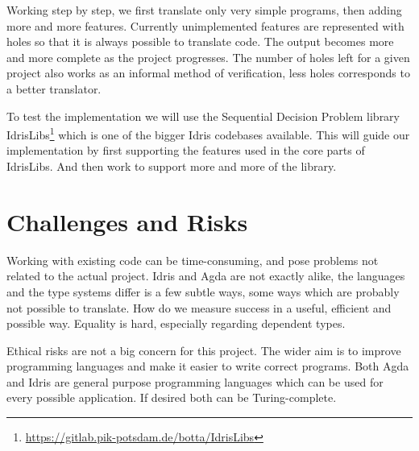 \documentclass[parskip=half]{scrartcl}
\begin{document}

Working step by step, we first translate only very simple programs, then adding
more and more features. Currently unimplemented features are represented with
holes so that it is always possible to translate code. The output becomes more
and more complete as the project progresses. The number of holes left for
a given project also works as an informal method of verification, less holes
corresponds to a better translator.

To test the implementation we will use the Sequential Decision Problem library
IdrisLibs\footnote{\url{https://gitlab.pik-potsdam.de/botta/IdrisLibs}} which is one
of the bigger Idris codebases available. This will guide our implementation by
first supporting the features used in the core parts of IdrisLibs. And then
work to support more and more of the library.


\section{Challenges and Risks}
Working with existing code can be time-consuming, and pose problems not related
to the actual project.  Idris and Agda are not exactly alike, the languages and
the type systems differ is a few subtle ways, some ways which are probably not
possible to translate.  How do we measure success in a useful, efficient and
possible way. Equality is hard, especially regarding dependent types.

Ethical risks are not a big concern for this project. The wider aim is to
improve programming languages and make it easier to write correct programs.
Both Agda and Idris are general purpose programming languages which can be
used for every possible application. If desired both can be Turing-complete.

\end{document}
